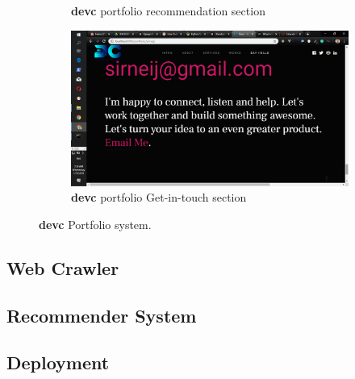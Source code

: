 \begin{itemize}
\begin{figure}[!htbp]
\begin{subfigure}[b]{0.45\textwidth}
			\caption{\textbf{devc} portfolio recommendation section}
		\end{subfigure}
		\medskip
		\begin{subfigure}[b]{0.5\textwidth}
			\centering
			\includegraphics[width=\linewidth]{./devcportgetintouch}
			\caption{\textbf{devc} portfolio Get-in-touch section}
		\end{subfigure}
		\caption{\textbf{devc} Portfolio system.}
	\end{figure}
\end{itemize}
\subsection{Web Crawler}
\subsection{Recommender System}
\subsection{Deployment}
